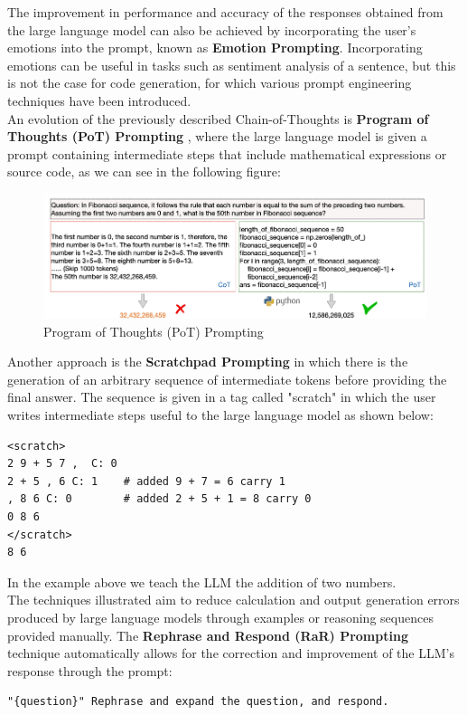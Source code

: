 The improvement in performance and accuracy of the responses obtained from the large language model can also be achieved by incorporating the user's emotions into the prompt, known as \textbf{Emotion Prompting}.
Incorporating emotions can be useful in tasks such as sentiment analysis of a sentence, but this is not the case for code generation, for which various prompt engineering techniques have been introduced. \\
An evolution of the previously described Chain-of-Thoughts is \textbf{Program of Thoughts (PoT) Prompting} \cite{chen2022program}, where the large language model is given a prompt containing intermediate steps that include mathematical expressions or source code, as we can see in the following figure:
\begin{figure}[H]
    \centering
    \includegraphics[width=0.7\linewidth]{Figures/fig_8.png}
    \caption{Program of Thoughts (PoT) Prompting}
    \label{fig:enter-label}
\end{figure}
Another approach is the \textbf{Scratchpad Prompting} in which there is the generation of an arbitrary sequence of intermediate tokens before providing the final answer. The sequence is given in a tag called "scratch"\cite{scratch}\cite{nye2021show} in which the user writes intermediate steps useful to the large language model as shown below: 
\begin{lstlisting}
<scratch>
2 9 + 5 7 ,  C: 0
2 + 5 , 6 C: 1    # added 9 + 7 = 6 carry 1
, 8 6 C: 0        # added 2 + 5 + 1 = 8 carry 0
0 8 6
</scratch>
8 6
\end{lstlisting}
In the example above we teach the LLM the addition of two numbers. \\
The techniques illustrated aim to reduce calculation and output generation errors produced by large language models through examples or reasoning sequences provided manually. The \textbf{Rephrase and Respond (RaR) Prompting}\cite{deng2023rephrase} technique automatically allows for the correction and improvement of the LLM's response through the prompt:
\begin{lstlisting}
"{question}" Rephrase and expand the question, and respond.
\end{lstlisting}

